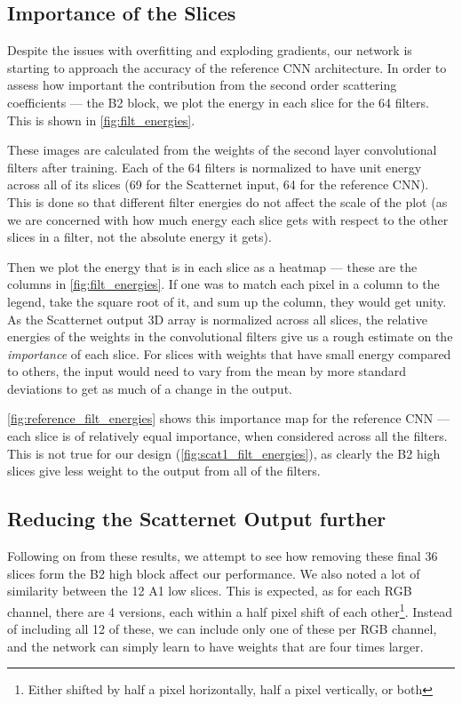 \subsection{Importance of the Slices}
  Despite the issues with overfitting and exploding gradients, our network is
  starting to approach the accuracy of the reference CNN architecture. In order
  to assess how important the contribution from the second order scattering
  coefficients --- the B2 block, we plot the energy in each slice for the 64
  filters. This is shown in \autoref{fig:filt_energies}.

  These images are calculated from the weights of the second layer
  convolutional filters after training. Each of the 64 filters is normalized to
  have unit energy across all of its slices (69 for the Scatternet input, 64
  for the reference CNN). This is done so that different filter energies do not affect the
  scale of the plot (as we are concerned with how much energy each slice gets
  with respect to the other slices in a filter, not the absolute energy it
  gets). 
  
  Then we plot the energy that is in each slice as
  a heatmap --- these are the columns in \autoref{fig:filt_energies}. If one
  was to match each pixel in a column to the legend, take the square root of
  it, and sum up the column, they would get unity. As the Scatternet output 3D
  array is normalized across all slices, the relative energies of the weights
  in the convolutional filters give us a rough estimate on the
  \emph{importance} of each slice. For slices with weights that have small
  energy compared to others, the input would need to vary from the mean by more
  standard deviations to get as much of a change in the output.

  \autoref{fig:reference_filt_energies} shows this importance map for the
  reference CNN --- each slice is of relatively equal importance, when
  considered across all the filters. This is not true for our design
  (\autoref{fig:scat1_filt_energies}), as clearly the B2 high slices give less
  weight to the output from all of the filters.



\subsection{Reducing the Scatternet Output further}\label{sec:best_scat}
  Following on from these results, we attempt to see how removing these final
  36 slices form the B2 high block affect our performance. We also noted a lot
  of similarity between the 12 A1 low slices. This is expected, as for each RGB
  channel, there are 4 versions, each within a half pixel shift of each
  other\footnote{Either shifted by half a pixel horizontally, half a pixel vertically, or
  both}. Instead of including all 12 of these, we can include only one of
  these per RGB channel, and the network can simply learn to have weights that are four times
  larger.

